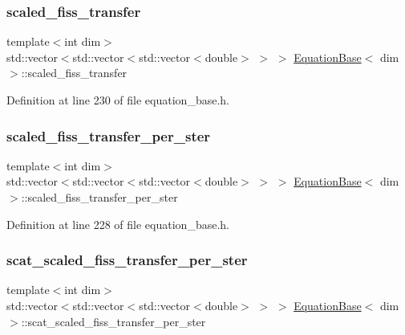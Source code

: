 \subsubsection{\texorpdfstring{scaled\+\_\+fiss\+\_\+transfer}{scaled\_fiss\_transfer}}
{\footnotesize\ttfamily template$<$int dim$>$ \\
std\+::vector$<$std\+::vector$<$std\+::vector$<$double$>$ $>$ $>$ \hyperlink{class_equation_base}{Equation\+Base}$<$ dim $>$\+::scaled\+\_\+fiss\+\_\+transfer\hspace{0.3cm}{\ttfamily [protected]}}



Definition at line 230 of file equation\+\_\+base.\+h.

\mbox{\label{class_equation_base_a5452991f01541261dba1e0322a0f5392}} 
\subsubsection{\texorpdfstring{scaled\+\_\+fiss\+\_\+transfer\+\_\+per\+\_\+ster}{scaled\_fiss\_transfer\_per\_ster}}
{\footnotesize\ttfamily template$<$int dim$>$ \\
std\+::vector$<$std\+::vector$<$std\+::vector$<$double$>$ $>$ $>$ \hyperlink{class_equation_base}{Equation\+Base}$<$ dim $>$\+::scaled\+\_\+fiss\+\_\+transfer\+\_\+per\+\_\+ster\hspace{0.3cm}{\ttfamily [protected]}}



Definition at line 228 of file equation\+\_\+base.\+h.

\mbox{\label{class_equation_base_ad445f7f2e377cc05f2003de4d632baa7}} 
\subsubsection{\texorpdfstring{scat\+\_\+scaled\+\_\+fiss\+\_\+transfer\+\_\+per\+\_\+ster}{scat\_scaled\_fiss\_transfer\_per\_ster}}
{\footnotesize\ttfamily template$<$int dim$>$ \\
std\+::vector$<$std\+::vector$<$std\+::vector$<$double$>$ $>$ $>$ \hyperlink{class_equation_base}{Equation\+Base}$<$ dim $>$\+::scat\+\_\+scaled\+\_\+fiss\+\_\+transfer\+\_\+per\+\_\+ster\hspace{0.3cm}{\ttfamily [protected]}}




